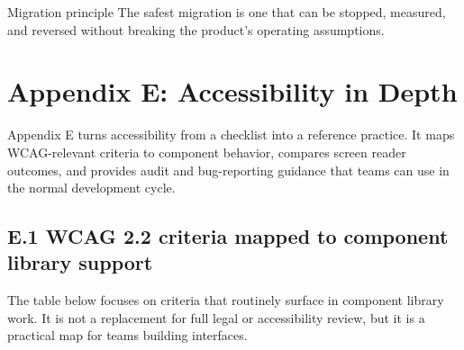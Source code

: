 \begin{highlightbox}{Migration principle}
The safest migration is one that can be stopped, measured, and reversed without breaking the product's operating assumptions.
\end{highlightbox}

\clearpage
{}
\section*{Appendix E: Accessibility in Depth}

Appendix E turns accessibility from a checklist into a reference practice. It maps WCAG-relevant criteria to component behavior, compares screen reader outcomes, and provides audit and bug-reporting guidance that teams can use in the normal development cycle.

\subsection*{E.1 WCAG 2.2 criteria mapped to component library support}
The table below focuses on criteria that routinely surface in component library work. It is not a replacement for full legal or accessibility review, but it is a practical map for teams building interfaces.

